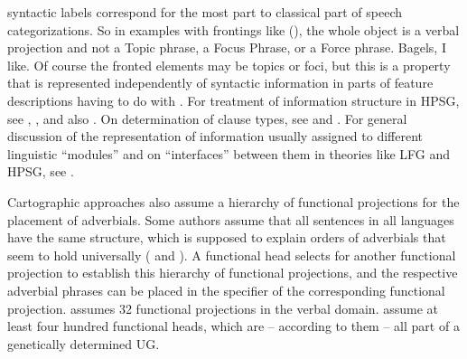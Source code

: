 \documentclass[output=paper
	        ,collection
	        ,collectionchapter
 	        ,biblatex
                ,babelshorthands
                ,newtxmath
                ,draftmode
                ,colorlinks, citecolor=brown
]{langscibook}
\begin{document}
syntactic labels correspond for the most part to classical part of speech categorizations. So in examples with
frontings like (), the whole object is a verbal projection and not a Topic phrase, a Focus
Phrase, or a Force phrase.
\ea
Bagels, I like.
\z
Of course the fronted elements may be topics or foci, but this is a property that is represented
independently of syntactic information in parts of feature descriptions having to do with
. For treatment of information structure in HPSG, see
, , and also . On determination of clause types, see
 and . For general discussion of the representation of
information usually assigned to different linguistic ``modules'' and on ``interfaces''
between them in theories like LFG and HPSG, see .

Cartographic approaches also assume a hierarchy of functional projections for the placement of
adverbials. Some authors assume that all sentences in all languages have the same structure, which is supposed
to explain orders of adverbials that seem to hold universally (\eg \citealp[]{Cinque99a-u}
and \citealp[--55]{CR2010a}). A functional head selects for another functional
projection to establish this hierarchy of functional projections, and the respective adverbial
phrases can be placed in the specifier of the corresponding functional projection. \citet[]{Cinque99a-u} assumes 32 functional projections in the verbal domain. \citet[, 65]{CR2010a} assume at least four hundred functional heads, which are -- according to them -- all
part of a genetically determined UG.
\end{document}
